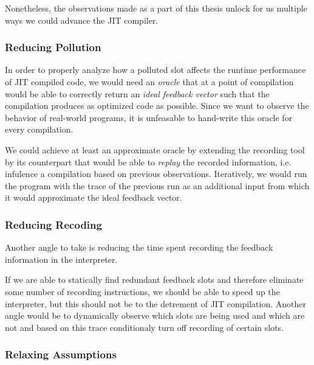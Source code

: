 Nonetheless, the observations made as a part of this thesis unlock for us multiple ways we could advance the JIT compiler.

\subsubsection*{Reducing Pollution}

In order to properly analyze how a polluted slot affects the runtime performance of JIT compiled code, we would need an \textit{oracle} that at a point of compilation would be able to correctly return an \textit{ideal feedback vector} such that the compilation produces as optimized code as possible. Since we want to observe the behavior of real-world programs, it is unfeasable to hand-write this oracle for every compilation.

We could achieve at least an approximate oracle by extending the recording tool by its counterpart that would be able to \textit{replay} the recorded information, i.e. infulence a compilation based on previous observations. Iteratively, we would run the program with the trace of the previous run as an additional input from which it would approximate the ideal feedback vector.

\subsubsection*{Reducing Recoding}

Another angle to take is reducing the time spent recording the feedback information in the interpreter.

If we are able to statically find redundant feedback slots and therefore eliminate some number of recording instructions, we should be able to speed up the interpreter, but this should not be to the detrement of JIT compilation. Another angle would be to dynamically observe which slots are being used and which are not and based on this trace conditionaly turn off recording of certain slots.

\subsubsection*{Relaxing Assumptions}

